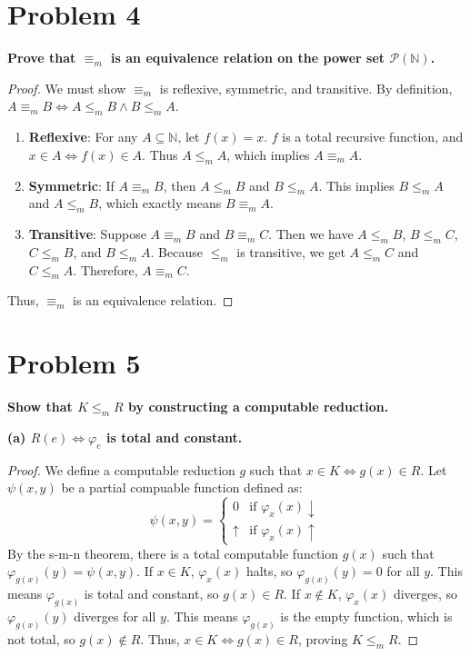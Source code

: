 \documentclass{article}
\begin{document}
\hrulefill

\section*{Problem 4}
\textbf{Prove that $\equiv_m$ is an equivalence relation on the power set $\mathcal{P}(\mathbb{N})$.}

\begin{proof}
We must show $\equiv_m$ is reflexive, symmetric, and transitive. By definition, $A \equiv_m B \iff A \leq_m B \land B \leq_m A$.
\begin{enumerate}
    \item \textbf{Reflexive}: For any $A \subseteq \mathbb{N}$, let $f(x) = x$. $f$ is a total recursive function, and $x \in A \iff f(x) \in A$. Thus $A \leq_m A$, which implies $A \equiv_m A$.
    \item \textbf{Symmetric}: If $A \equiv_m B$, then $A \leq_m B$ and $B \leq_m A$. This implies $B \leq_m A$ and $A \leq_m B$, which exactly means $B \equiv_m A$.
    \item \textbf{Transitive}: Suppose $A \equiv_m B$ and $B \equiv_m C$. Then we have $A \leq_m B$, $B \leq_m C$, $C \leq_m B$, and $B \leq_m A$. Because $\leq_m$ is transitive, we get $A \leq_m C$ and $C \leq_m A$. Therefore, $A \equiv_m C$.
\end{enumerate}
Thus, $\equiv_m$ is an equivalence relation.
\end{proof}

\hrulefill

\section*{Problem 5}
\textbf{Show that $K \leq_m R$ by constructing a computable reduction.}

\textbf{(a) $R(e) \iff \varphi_e$ is total and constant.}

\begin{proof}
We define a computable reduction $g$ such that $x \in K \iff g(x) \in R$.
Let $\psi(x, y)$ be a partial compuable function defined as:
\[
\psi(x, y) = 
\begin{cases} 
0 & \text{if } \varphi_x(x) \downarrow \\
\uparrow & \text{if } \varphi_x(x) \uparrow
\end{cases}
\]
By the s-m-n theorem, there is a total computable function $g(x)$ such that $\varphi_{g(x)}(y) = \psi(x, y)$.
If $x \in K$, $\varphi_x(x)$ halts, so $\varphi_{g(x)}(y) = 0$ for all $y$. This means $\varphi_{g(x)}$ is total and constant, so $g(x) \in R$.
If $x \notin K$, $\varphi_x(x)$ diverges, so $\varphi_{g(x)}(y)$ diverges for all $y$. This means $\varphi_{g(x)}$ is the empty function, which is not total, so $g(x) \notin R$.
Thus, $x \in K \iff g(x) \in R$, proving $K \leq_m R$.
\end{proof}
\end{document}
